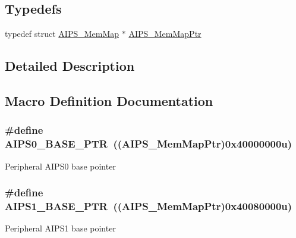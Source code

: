 \subsection*{Typedefs}
\begin{DoxyCompactItemize}
\item 
typedef struct \hyperlink{struct_a_i_p_s___mem_map}{A\+I\+P\+S\+\_\+\+Mem\+Map} $\ast$ \hyperlink{group___a_i_p_s___peripheral_ga6a37456f1049f1d08787b6ffe1c8a9b3}{A\+I\+P\+S\+\_\+\+Mem\+Map\+Ptr}
\end{DoxyCompactItemize}


\subsection{Detailed Description}


\subsection{Macro Definition Documentation}
\hypertarget{group___a_i_p_s___peripheral_ga6affb22d1dff0d01c843913f33f1c1a9}{}
\subsubsection[{A\+I\+P\+S0\+\_\+\+B\+A\+S\+E\+\_\+\+P\+T\+R}]{\setlength{\rightskip}{0pt plus 5cm}\#define A\+I\+P\+S0\+\_\+\+B\+A\+S\+E\+\_\+\+P\+T\+R~(({\bf A\+I\+P\+S\+\_\+\+Mem\+Map\+Ptr})0x40000000u)}\label{group___a_i_p_s___peripheral_ga6affb22d1dff0d01c843913f33f1c1a9}
Peripheral A\+I\+P\+S0 base pointer \hypertarget{group___a_i_p_s___peripheral_gab38278851053aa66f9683ed8707e23bc}{}
\subsubsection[{A\+I\+P\+S1\+\_\+\+B\+A\+S\+E\+\_\+\+P\+T\+R}]{\setlength{\rightskip}{0pt plus 5cm}\#define A\+I\+P\+S1\+\_\+\+B\+A\+S\+E\+\_\+\+P\+T\+R~(({\bf A\+I\+P\+S\+\_\+\+Mem\+Map\+Ptr})0x40080000u)}\label{group___a_i_p_s___peripheral_gab38278851053aa66f9683ed8707e23bc}
Peripheral A\+I\+P\+S1 base pointer \hypertarget{group___a_i_p_s___peripheral_gacdda032ccd174e1d8c1a02b1e0f7a441}{}
